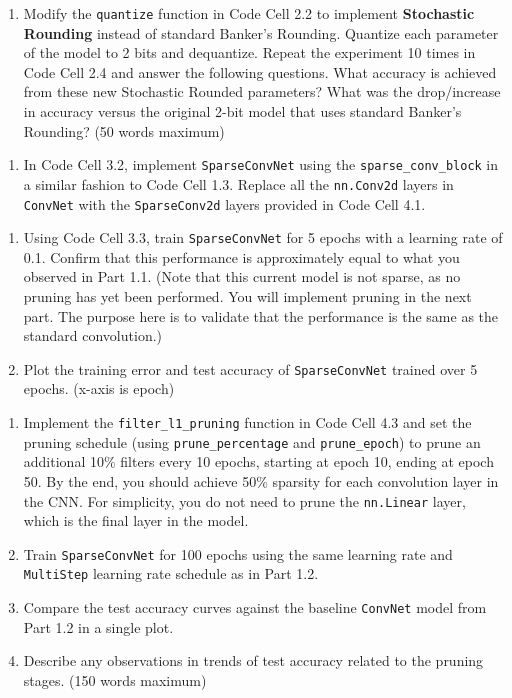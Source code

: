 \documentclass[a4 paper]{article}
\newcommand{\pya}[1]{\texttt{#1}}
\begin{document}
\solution{}


\begin{enumerate}
    \item Modify the \pya{quantize} function in Code Cell 2.2 to implement \textbf{Stochastic Rounding} instead of standard Banker's Rounding. Quantize each parameter of the model to 2 bits and dequantize. Repeat the experiment 10 times in Code Cell 2.4 and answer the following questions. What accuracy is achieved from these new Stochastic Rounded parameters? What was the drop/increase in accuracy versus the original 2-bit model that uses standard Banker's Rounding? (50 words maximum)
\end{enumerate}

\solution{}


\newpage
{}
\begin{enumerate}
    \item In Code Cell 3.2, implement \pya{SparseConvNet} using the \pya{sparse_conv_block} in a similar fashion to Code Cell 1.3. Replace all the \pya{nn.Conv2d} layers in \pya{ConvNet} with the \pya{SparseConv2d} layers provided in Code Cell 4.1.
\end{enumerate}

\solution{}

\begin{enumerate}
    \item Using Code Cell 3.3, train \pya{SparseConvNet} for 5 epochs with a learning rate of 0.1. Confirm that this performance is approximately equal to what you observed in Part 1.1. (Note that this current model is not sparse, as no pruning has yet been performed. You will implement pruning in the next part. The purpose here is to validate that the performance is the same as the standard convolution.)
    \item Plot the training error and test accuracy of \pya{SparseConvNet} trained over 5 epochs. (x-axis is epoch)
\end{enumerate}

\solution{}


\begin{enumerate}
    \item Implement the \pya{filter_l1_pruning} function in Code Cell 4.3 and set the pruning schedule (using \pya{prune_percentage} and \pya{prune_epoch}) to prune an additional 10\% filters every 10 epochs, starting at epoch 10, ending at epoch 50. By the end, you should achieve 50\% sparsity for each convolution layer in the CNN. For simplicity, you do not need to prune the \pya{nn.Linear} layer, which is the final layer in the model.
    \item Train \pya{SparseConvNet} for 100 epochs using the same learning rate and \pya{MultiStep} learning rate schedule as in Part 1.2.
    \item Compare the test accuracy curves against the baseline \pya{ConvNet} model from Part 1.2 in a single plot.
    \item Describe any observations in trends of test accuracy related to the pruning stages. (150 words maximum)
\end{enumerate}
\end{document}
